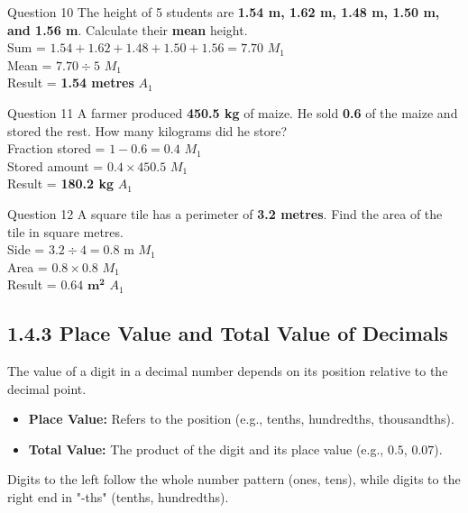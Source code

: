 \documentclass[12pt, a4paper, oneside]{article}
\begin{document}
\begin{solvingbox}{Question 10}
The height of 5 students are \textbf{1.54 m, 1.62 m, 1.48 m, 1.50 m, and 1.56 m}. Calculate their \textbf{mean} height. \\
Sum = $1.54 + 1.62 + 1.48 + 1.50 + 1.56 = 7.70$ \hfill $M_1$ \\
Mean = $7.70 \div 5$ \hfill $M_1$ \\
Result = \textbf{1.54 metres} \hfill $A_1$
\end{solvingbox}

\begin{solvingbox}{Question 11}
A farmer produced \textbf{450.5 kg} of maize. He sold \textbf{0.6} of the maize and stored the rest. How many kilograms did he store? \\
Fraction stored = $1 - 0.6 = 0.4$ \hfill $M_1$ \\
Stored amount = $0.4 \times 450.5$ \hfill $M_1$ \\
Result = \textbf{180.2 kg} \hfill $A_1$
\end{solvingbox}

\begin{solvingbox}{Question 12}
A square tile has a perimeter of \textbf{3.2 metres}. Find the area of the tile in square metres. \\
Side = $3.2 \div 4 = 0.8$ m \hfill $M_1$ \\
Area = $0.8 \times 0.8$ \hfill $M_1$ \\
Result = $\mathbf{0.64\text{ m}^2}$ \hfill $A_1$
\end{solvingbox}

\subsection*{1.4.3 Place Value and Total Value of Decimals}

\begin{tcolorbox}[colback=lightgrey, colframe=primaryblue, title=\textbf{Concept Summary}, arc=5pt]
    The value of a digit in a decimal number depends on its position relative to the decimal point.
    \begin{itemize}
        \item \textbf{Place Value:} Refers to the position (e.g., tenths, hundredths, thousandths).
        \item \textbf{Total Value:} The product of the digit and its place value (e.g., $0.5$, $0.07$).
    \end{itemize}
    Digits to the left follow the whole number pattern (ones, tens), while digits to the right end in "-ths" (tenths, hundredths).
\end{tcolorbox}
\end{document}
